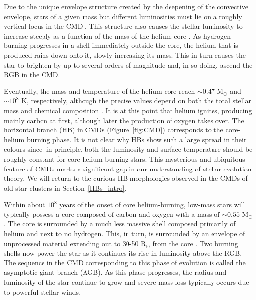 Due to the unique envelope structure created by the deepening of the
convective envelope, stars of a given mass but different luminosities
must lie on a roughly vertical locus in the CMD
\citep{hayashi62}.  This structure also 
causes the stellar luminosity to increase steeply as a function of the
mass of the helium core \citep[e.g.][]{iben68}.  As hydrogen burning
progresses in 
a shell immediately outside the core, the helium that is produced
rains down onto it, slowly increasing its mass.  This in turn causes
the star to brighten by up to several orders of 
magnitude and, in so doing, ascend the RGB in the CMD.  

Eventually, the mass and temperature of the helium core reach $\sim
0.47$ M$_{\odot}$ and $\sim 10^8$ K, respectively, although the
precise values depend on both the total stellar mass and chemical
composition \citep{eggleton06}.  It is at this 
point that helium ignites, producing mainly carbon at first, although
later the production of oxygen takes over.  The horizontal branch (HB) in
CMDs (Figure~\ref{fig:CMD}) corresponds to
the core-helium burning phase.  It is not clear why HBs show such a
large spread in their colours since, in principle, both the luminosity
and surface temperature should be roughly constant for core
helium-burning stars.  This mysterious and ubiquitous feature of CMDs
marks a significant gap in our understanding of stellar evolution
theory.  We will return to the curious HB morphologies observed in
the CMDs of old star clusters in Section~\ref{HBs_intro}.

Within about $10^8$ years of the onset of core helium-burning,
low-mass stars will typically possess a core composed of carbon and
oxygen with a mass of $\sim 0.55$ M$_{\odot}$ \citep{iben74}.  The
core is surrounded by a much less massive shell composed primarily of
helium and next to no hydrogen.  This, in turn, is surrounded by an
envelope of unprocessed material extending out to 30-50 R$_{\odot}$
from the core \citep{maeder09}.  Two burning shells now power the
star as it continues 
its rise in luminosity above the RGB.  The sequence in the CMD
corresponding to this phase of evolution is called the asymptotic
giant branch (AGB).  As this phase progresses, the radius and
luminosity of the star
continue to grow and severe mass-loss typically occurs due to
powerful stellar winds.

